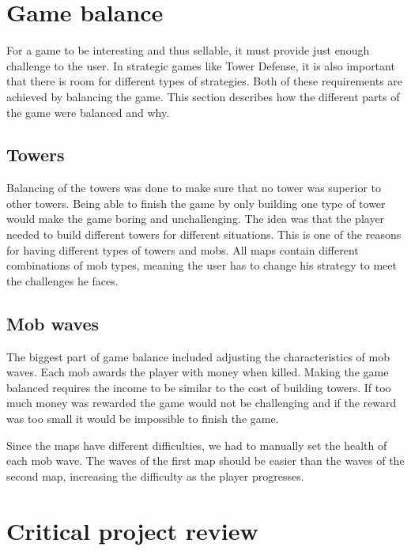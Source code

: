 \section{Game balance}

For a game to be interesting and thus sellable, it must provide just enough challenge to the user. In strategic games like Tower Defense, it is also important that there is room for different types of strategies. Both of these requirements are achieved by balancing the game. This section describes how the different parts of the game were balanced and why.

\subsection{Towers}

Balancing of the towers was done to make sure that no tower was superior to other towers. Being able to finish the game by only building one type of tower would make the game boring and unchallenging. The idea was that the player needed to build different towers for different situations. This is one of the reasons for having different types of towers and mobs. All maps contain different combinations of mob types, meaning the user has to change his strategy to meet the challenges he faces.
\subsection{Mob waves}

The biggest part of game balance included adjusting the characteristics of mob waves. Each mob awards the player with money when killed. Making the game balanced requires the income to be similar to the cost of building towers. If too much money was rewarded the game would not be challenging and if the reward was too small it would be impossible to finish the game.

Since the maps have different difficulties, we had to manually set the health of each mob wave. The waves of the first map should be easier than the waves of the second map, increasing the difficulty as the player progresses. 
\section{Critical project review}

